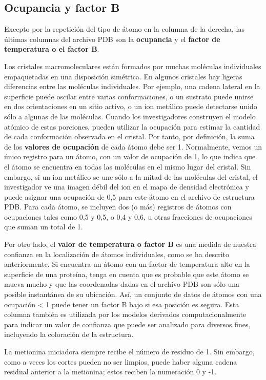 \subsection{Ocupancia y factor B}
Excepto por la repetición del tipo de átomo en la columna de la derecha, las últimas columnas del archivo PDB son la \textbf{ocupancia} y el \textbf{factor de temperatura o el factor B}.

Los cristales macromoleculares están formados por muchas moléculas individuales empaquetadas en una disposición simétrica. En algunos cristales hay ligeras diferencias entre las moléculas individuales. Por ejemplo, una cadena lateral en la superficie puede oscilar entre varias conformaciones, o un sustrato puede unirse en dos orientaciones en un sitio activo, o un ion metálico puede detectarse unido sólo a algunas de las moléculas. Cuando los investigadores construyen el modelo atómico de estas porciones, pueden utilizar la ocupación para estimar la cantidad de cada conformación observada en el cristal. Por tanto, por definición, la suma de los \textbf{valores de ocupación} de cada átomo debe ser 1. Normalmente, vemos un único registro para un átomo, con un valor de ocupación de 1, lo que indica que el átomo se encuentra en todas las moléculas en el mismo lugar del cristal. Sin embargo, si un ion metálico se une sólo a la mitad de las moléculas del cristal, el investigador ve una imagen débil del ion en el mapa de densidad electrónica y puede asignar una ocupación de 0,5 para este átomo en el archivo de estructura PDB. Para cada átomo, se incluyen dos (o más) registros de átomos con ocupaciones tales como 0,5 y 0,5, o 0,4 y 0,6, u otras fracciones de ocupaciones que suman un total de 1.

Por otro lado, el \textbf{valor de temperatura o factor B} es una medida de nuestra confianza en la localización de átomos individuales, como se ha descrito anteriormente. Si encuentra un átomo con un factor de temperatura alto en la superficie de una proteína, tenga en cuenta que es probable que este átomo se mueva mucho y que las coordenadas dadas en el archivo PDB son sólo una posible instantánea de su ubicación. Así, un conjunto de datos de átomos con una ocupación < 1 puede tener un factor B bajo si esa posición es segura. 
Esta columna también es utilizada por los modelos derivados computacionalmente para indicar un valor de confianza que puede ser analizado para diversos fines, incluyendo la coloración de la estructura.

La metionina iniciadora siempre recibe el número de residuo de 1. Sin embargo, como a veces los cortes pueden no ser limpios, puede haber alguna cadena residual anterior a la metionina; estos reciben la numeración 0 y -1.

